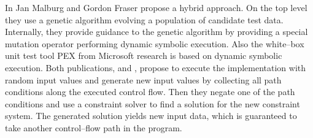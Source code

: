 \documentclass[runningheads,a4paper]{llncs}%
\begin{document}
In \cite{malburg2011combining} Jan Malburg and Gordon Fraser propose a hybrid approach. On the top level they use a genetic algorithm evolving a population of candidate test data. Internally, they provide guidance to the genetic algorithm by providing a special mutation operator performing dynamic symbolic execution. Also the white--box unit test tool PEX \cite{pex} from Microsoft\textsuperscript{\textregistered} research is based on dynamic symbolic execution. Both publications, \cite{malburg2011combining} and \cite{pex}, propose to execute the implementation with random input values and generate new input values by collecting all path conditions along the executed control flow. Then they negate one of the path conditions and use a constraint solver to find a solution for the new constraint system. The generated solution yields new input data, which is guaranteed to take another control--flow path in the program.%
\end{document}
